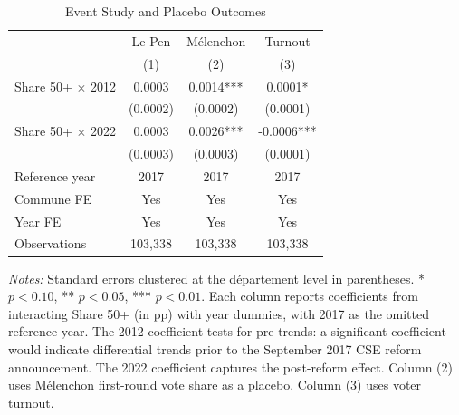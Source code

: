\begin{table}[H]
\centering
\caption{Event Study and Placebo Outcomes}
\label{tab:event}
\begin{threeparttable}
\begin{tabular}{l *{3}{c}}
\toprule
& Le Pen & M\'elenchon & Turnout \\
& (1) & (2) & (3) \\
\midrule
Share 50+ $\times$ 2012 & 0.0003 & 0.0014*** & 0.0001* \\
& (0.0002) & (0.0002) & (0.0001) \\[0.5em]
Share 50+ $\times$ 2022 & 0.0003 & 0.0026*** & -0.0006*** \\
& (0.0003) & (0.0003) & (0.0001) \\[0.5em]
\midrule
Reference year & 2017 & 2017 & 2017 \\
Commune FE & Yes & Yes & Yes \\
Year FE & Yes & Yes & Yes \\
Observations & 103,338 & 103,338 & 103,338 \\
\bottomrule
\end{tabular}
\begin{tablenotes}[flushleft]
\small
\item \textit{Notes:} Standard errors clustered at the d\'epartement level in parentheses. * $p<0.10$, ** $p<0.05$, *** $p<0.01$. Each column reports coefficients from interacting Share 50+ (in pp) with year dummies, with 2017 as the omitted reference year. The 2012 coefficient tests for pre-trends: a significant coefficient would indicate differential trends prior to the September 2017 CSE reform announcement. The 2022 coefficient captures the post-reform effect. Column (2) uses M\'elenchon first-round vote share as a placebo. Column (3) uses voter turnout.
\end{tablenotes}
\end{threeparttable}
\end{table}
